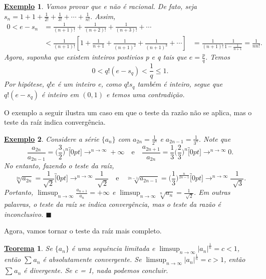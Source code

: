 \documentclass{article}
\newtheorem*{theorem*}{\underline{Teorema}}
\newtheorem{example}{\underline{Exemplo}}
\renewcommand\qedsymbol{$\blacksquare$}
\begin{document}
 \begin{example}
   Vamos provar que e n\~ao \'e racional. De fato, seja $s_{n} = 1 + 1 + \frac{1}{2!} + \frac{1}{3!} + \cdots + \frac{1}{n!}.$ Assim, 
  \begin{align*}
    0 < e - s_{n} &= \frac{1}{(n+1)!}+\frac{1}{(n+2)!} + \frac{1}{(n+3)!} + \cdots \\
                  &< \frac{1}{(n+1)!}[1+\frac{1}{n+1}+\frac{1}{(n+1)^{2}}+ \frac{1}{(n+1)^{3}}+\cdots]
                  &= \frac{1}{(n+1)!}\frac{1}{1-\frac{1}{n+1}} = \frac{1}{nn!}.
  \end{align*}
  Agora, suponha que existem inteiros postivios p e q tais que $e = \frac{p}{q}$. Temos 
    $$
      0 < q!(e-s_{q})<\frac{1}{q}\leq{1}.
    $$
  Por hip\'otese, $q!e$ \'e um inteiro e, como $q!s_{q}$ tamb\'em \'e inteiro, segue que $q!(e-s_{q})$ \'e inteiro em $(0,1)$ e temos
uma contradi\c c\~ao.
 \end{example}
 O exemplo a seguir ilustra um caso em que o teste da raz\~ao n\~ao se aplica, mas o teste da ra\'iz indica converg\^encia.
 \begin{example}
   Considere a s\'erie $\{a_{n}\}$ com $a_{2n} = \frac{1}{2^{n}}$ e $a_{2n-1}= \frac{1}{3^{n}}.$ Note que 
     $$
     \frac{a_{2n}}{a_{2n-1}} = \biggl(\frac{3}{2}\biggr)^{n}\overbracket[0pt]{\longrightarrow}^{n\to \infty}+\infty\quad\text{e}\quad \frac{a_{2n+1}}{a_{2n}} = \frac{1}{3}\biggl(\frac{2}{3}\biggr)^{n}\overbracket[0pt]{\longrightarrow}^{n\to \infty}0.
     $$
  No entanto, fazendo o teste da ra\'iz, 
    $$
    \sqrt[2n]{a_{2n}} = \frac{1}{\sqrt{2}}\overbracket[0pt]{\longrightarrow}^{n\to \infty}\frac{1}{\sqrt[]{2}}\quad\text{e}\quad \sqrt[2n-1]{a_{2n-1}}=\biggl(\frac{1}{3}\biggr)^{\frac{n}{2n-1}}\overbracket[0pt]{\longrightarrow}^{n\to \infty}\frac{1}{\sqrt[]{3}}.
    $$
  Portanto, $\limsup_{n\to\infty}\frac{a_{n+1}}{a_{n}} = +\infty$ e $\limsup_{n\to\infty}\sqrt[n]{a_{n}} = \frac{1}{\sqrt[]{2}}$. Em outras palavras,
o teste da ra\'iz se indica converg\^encia, mas o teste da raz\~ao \'e inconclusivo. \qedsymbol
 \end{example}
  Agora, vamos tornar o teste da ra\'iz mais completo.
  \begin{theorem*}
   Se $\{a_{n}\}$ \'e uma sequ\^encia limitada e $\limsup_{n\to\infty}|a_{n}|^{\frac{1}{n}} = c < 1$, ent\~ao $\sum\limits_{}^{}a_{n}$
  \'e absolutamente convergente. Se $\limsup_{n\to\infty}|a_{n}|^{\frac{1}{n}} = c > 1$, ent\~ao $\sum\limits_{}^{}a_{n}$ \'e divergente. 
  Se c = 1, nada podemos concluir.
 \end{theorem*}
\end{document}
